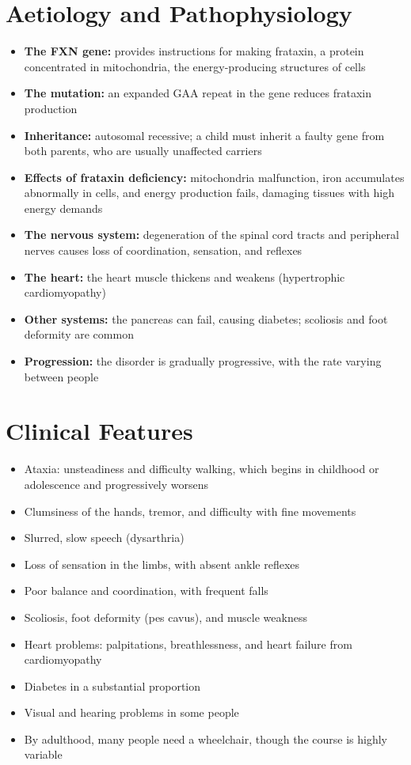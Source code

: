\section*{Aetiology and Pathophysiology}
\begin{itemize}
    \item \textbf{The FXN gene:} provides instructions for making frataxin, a protein concentrated in mitochondria, the energy-producing structures of cells
    \item \textbf{The mutation:} an expanded GAA repeat in the gene reduces frataxin production
    \item \textbf{Inheritance:} autosomal recessive; a child must inherit a faulty gene from both parents, who are usually unaffected carriers
    \item \textbf{Effects of frataxin deficiency:} mitochondria malfunction, iron accumulates abnormally in cells, and energy production fails, damaging tissues with high energy demands
    \item \textbf{The nervous system:} degeneration of the spinal cord tracts and peripheral nerves causes loss of coordination, sensation, and reflexes
    \item \textbf{The heart:} the heart muscle thickens and weakens (hypertrophic cardiomyopathy)
    \item \textbf{Other systems:} the pancreas can fail, causing diabetes; scoliosis and foot deformity are common
    \item \textbf{Progression:} the disorder is gradually progressive, with the rate varying between people
\end{itemize}

\section*{Clinical Features}
\begin{itemize}
    \item Ataxia: unsteadiness and difficulty walking, which begins in childhood or adolescence and progressively worsens
    \item Clumsiness of the hands, tremor, and difficulty with fine movements
    \item Slurred, slow speech (dysarthria)
    \item Loss of sensation in the limbs, with absent ankle reflexes
    \item Poor balance and coordination, with frequent falls
    \item Scoliosis, foot deformity (pes cavus), and muscle weakness
    \item Heart problems: palpitations, breathlessness, and heart failure from cardiomyopathy
    \item Diabetes in a substantial proportion
    \item Visual and hearing problems in some people
    \item By adulthood, many people need a wheelchair, though the course is highly variable
\end{itemize}

